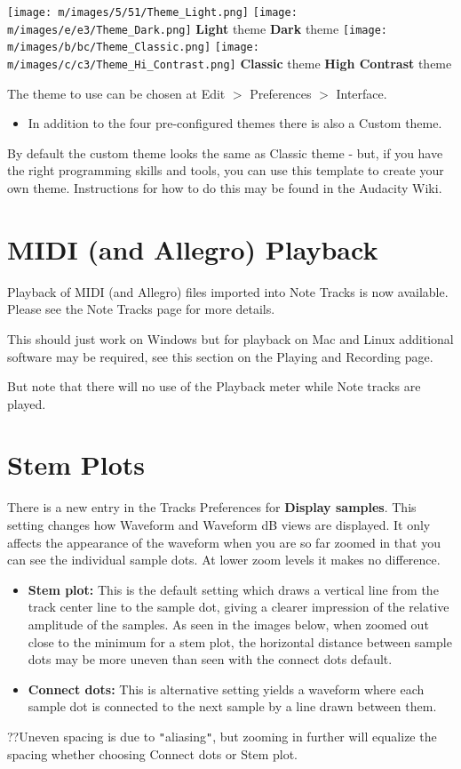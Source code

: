 \* \* \* \* \texttt{[image: m/images/5/51/Theme\_Light.png]}
\* \* \* \* \texttt{[image: m/images/e/e3/Theme\_Dark.png]}
\* \* \* \* 
\textbf{Light} theme
\* \* \* \* 
\textbf{Dark} theme
\* \* \* \* \texttt{[image: m/images/b/bc/Theme\_Classic.png]}
\* \* \* \* \texttt{[image: m/images/c/c3/Theme\_Hi\_Contrast.png]}
\* \* \* \* 
\textbf{Classic} theme
\* \* \* \* 
\textbf{High Contrast} theme

The theme to use can be chosen at Edit \mbox{$>$} Preferences \mbox{$>$} Interface.  
\begin{itemize}
\item  In addition to the four pre-configured themes there is also a Custom theme.  
\end{itemize}
 By default the custom theme looks the same as Classic theme - but, if you have the right programming skills and tools, you can use this template to create your own theme.  Instructions for how to do this may be found in the Audacity Wiki.


\section{MIDI (and Allegro) Playback}


Playback of MIDI (and Allegro) files imported into Note Tracks is now available.  Please see the Note Tracks page for more details.

This should just work on Windows but for playback on Mac and Linux additional software may be required, see this section on the Playing and Recording page.

But note that there will no use of the Playback meter while Note tracks are played. 

\section{Stem Plots}


There is a new entry in the Tracks Preferences for \textbf{Display samples}.  This setting changes how Waveform and Waveform dB views are displayed.  It only affects the appearance of the waveform when you are so far zoomed in that you can see the individual sample dots.  At lower zoom levels it makes no difference.  
\begin{itemize}
\item \textbf{Stem plot:} This is the default setting which draws a vertical line from the track center line to the sample dot, giving a clearer impression of the relative amplitude of the samples. As seen in the images below, when zoomed out close to the minimum for a stem plot, the horizontal distance between sample dots may be more uneven than seen with the connect dots default.   
\item \textbf{Connect dots:} This is alternative setting yields a waveform where each sample dot is connected to the next sample by a line drawn between them.  
\end{itemize}
??Uneven spacing is due to \texttt{{}"{}}aliasing\texttt{{}"{}}, but zooming in further will equalize the spacing whether choosing Connect dots or Stem plot.


